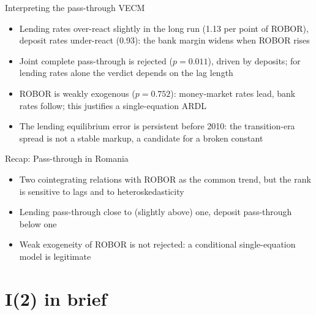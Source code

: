 \begin{frame}{Interpreting the pass-through VECM}
\itemsize{\small}
\begin{itemize}
    \item Lending rates over-react slightly in the long run (1.13 per point of ROBOR), deposit rates under-react (0.93): the bank margin widens when ROBOR rises
    \item Joint complete pass-through is rejected ($p = 0.011$), driven by deposits; for lending rates alone the verdict depends on the lag length
    \item ROBOR is weakly exogenous ($p = 0.752$): money-market rates lead, bank rates follow; this justifies a single-equation ARDL
    \item The lending equilibrium error is persistent before 2010: the transition-era spread is not a stable markup, a candidate for a broken constant 
\end{itemize}
\end{frame}

\begin{frame}{Recap: Pass-through in Romania}
\itemsize{\small}
\begin{itemize}
    \item Two cointegrating relations with ROBOR as the common trend, but the rank is sensitive to lags and to heteroskedasticity
    \item Lending pass-through close to (slightly above) one, deposit pass-through below one
    \item Weak exogeneity of ROBOR is not rejected: a conditional single-equation model is legitimate
\end{itemize}
\end{frame}


\section{I(2) in brief}

